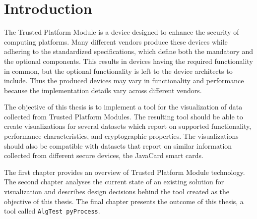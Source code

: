 \chapter{Introduction}
The Trusted Platform Module is a device designed to enhance the security of computing platforms. Many different vendors produce these devices while adhering to the standardized specifications, which define both the mandatory and the optional components. This results in devices having the required functionality in common, but the optional functionality is left to the device architects to include. Thus the produced devices may vary in functionality and performance because the implementation details vary across different vendors.

The objective of this thesis is to implement a tool for the visualization of data collected from Trusted Platform Modules. The resulting tool should be able to create visualizations for several datasets which report on supported functionality, performance characteristics, and cryptographic properties. The visualizations should also be compatible with datasets that report on similar information collected from different secure devices, the JavaCard smart cards.

The first chapter provides an overview of Trusted Platform Module technology. The second chapter analyses the current state of an existing solution for visualization and describes design decisions behind the tool created as the objective of this thesis. The final chapter  presents the outcome of this thesis, a tool called \texttt{AlgTest pyProcess}.


